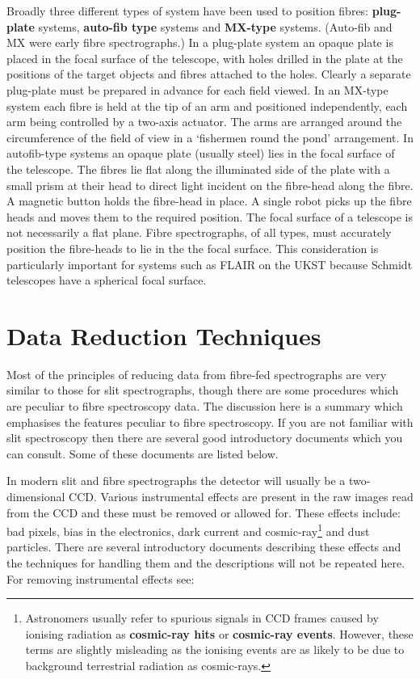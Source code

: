 \documentclass[chapters,twoside,11pt]{starlink}
\begin{document}
Broadly three different types of system have been used to position
fibres: \textbf{plug-plate} systems, \textbf{auto-fib type} systems and
\textbf{MX-type} systems.  (Auto-fib and MX were early fibre spectrographs.)
In a plug-plate system an opaque plate is placed in the focal surface
of the telescope, with holes drilled in the plate at the
positions of the target objects and fibres attached to the holes.
Clearly a separate plug-plate must be prepared in advance for each
field viewed.  In an MX-type system each fibre is held at the tip of an
arm and positioned independently, each arm being controlled by a
two-axis actuator.  The arms are arranged around the circumference
of the field of view in a `fishermen round the pond' arrangement.
In autofib-type systems an opaque plate (usually steel) lies in
the focal surface of the telescope.  The fibres lie flat along the
illuminated side of the plate with a small prism at their head to
direct light incident on the fibre-head along the fibre.  A magnetic
button holds the fibre-head in place.  A single robot picks up the
fibre heads and moves them to the required position.  The focal
surface of a telescope is not necessarily a flat plane.  Fibre
spectrographs, of all types, must accurately position the fibre-heads
to lie in the the focal surface.  This consideration is particularly
important for systems such as FLAIR on the UKST because Schmidt
telescopes have a spherical focal surface.


\section{\label{REDTECH}Data Reduction Techniques}

Most of the principles of reducing data from fibre-fed spectrographs
are very similar to those for slit spectrographs, though there are
some procedures which are peculiar to fibre spectroscopy data.  The
discussion here is a summary which emphasises the features peculiar to
fibre spectroscopy.  If you are not familiar with slit spectroscopy
then there are several good introductory documents which you can
consult.  Some of these documents are listed below.

In modern slit and fibre spectrographs the detector will usually be a
two-dimensional CCD.  Various instrumental effects are present in the
raw images read from the CCD and these must be removed or allowed for.
These effects include: bad pixels, bias in the electronics, dark current
and cosmic-ray\footnote{Astronomers usually refer to spurious signals
in CCD frames caused by ionising radiation as \textbf{cosmic-ray hits} or
\textbf{cosmic-ray events}.  However, these terms are slightly misleading
as the ionising events are as likely to be due to background
terrestrial radiation as cosmic-rays.} and dust particles.  There are
several introductory documents describing these effects and the techniques
for handling them and the descriptions will not be repeated here.  For
removing instrumental effects see:
\end{document}
